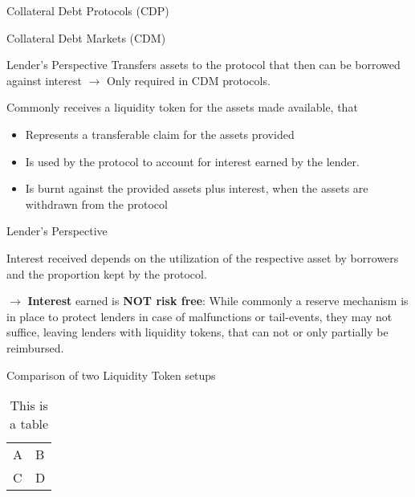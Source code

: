 \documentclass[handout]{beamer}
\begin{document}
\begin{frame}{Collateral Debt Protocols (CDP)}

	
\end{frame}


\begin{frame}{Collateral Debt Markets (CDM)}

	
\end{frame}


\begin{frame}{Lender's Perspective}
Transfers assets to the protocol that then can be borrowed against interest $\rightarrow$  Only required in CDM protocols.

\vspace{1em}

Commonly receives a liquidity token for the assets made available, that

\vspace{1em}

\begin{itemize}
  \item Represents a transferable claim for the assets provided
  \item Is used by the protocol to account for interest earned by the lender.
  \item Is burnt against the provided assets plus interest, when the assets are withdrawn from the protocol
\end{itemize}


\end{frame}


\begin{frame}{Lender's Perspective}

Interest received depends on the utilization of the respective asset by borrowers and the proportion kept by the protocol.
\vspace{2em}

$\rightarrow $ \textbf{Interest} earned is \textbf{NOT risk free}: While commonly a reserve mechanism is in place to protect lenders in case of malfunctions or tail-events, they may not suffice, leaving lenders with liquidity tokens, that can not or only partially be reimbursed.


\end{frame}



\begin{frame}{Comparison of two Liquidity Token setups}

	\begin{table}
		\begin{tabular}{ll}
			A & B\\
			C & D
		\end{tabular}
		\caption{This is a table}
		\label{tbl:simpletable}
	\end{table}
	
\end{frame}
\end{document}
